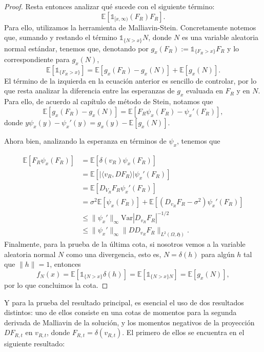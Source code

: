 \documentclass[letterpaper,twoside]{book}
\newcommand{\E}{\mathbb{E}}
\newcommand{\1}{\mathds{1}}
\newcommand{\abs}[1]{\left\lvert #1 \right\rvert}
\theoremstyle{definition}
\theoremstyle{definition}
\theoremstyle{definition}
\theoremstyle{definition}
\theoremstyle{definition}
\theoremstyle{definition}
\theoremstyle{definition}
\begin{document}
\begin{proof}
   Resta entonces analizar qué sucede con el siguiente término:
   \[
    \E\left[\1_{[x,\infty)}(F_R)F_R\right].
   \]
   Para ello, utilizamos la herramienta de Malliavin-Stein. Concretamente notemos que, sumando y restando el término $\1_{\{N>x\}}N$, donde $N$ es una variable aleatoria normal estándar, tenemos que, denotando por $g_x(F_R):=\1_{\{F_R>x\}}F_R$ y lo correspondiente para $g_x(N)$, 
   \[
    \E\left[\1_{\{F_R>x\}}\right]=\E\left[g_x(F_R)-g_x(N)\right]+\E\left[g_x(N)\right].
   \]
   El término de la izquierda en la ecuación anterior es sencillo de controlar, por lo que resta analizar la diferencia entre las esperanzas de $g_x$ evaluada en $F_R$ y en $N$. Para ello, de acuerdo al capítulo de método de Stein, notamos que 
   \[
   \E\left[g_x(F_R)-g_x(N)\right]=\E\left[F_R\psi_x(F_R)-\psi_x'(F_R)\right], 
   \]
   donde $y\psi_x(y)-\psi_x'(y)=g_x(y)-\E\left[g_x(N)\right]$.

   Ahora bien, analizando la esperanza en términos de $\psi_x$, tenemos que 
   
   \begin{align*}
    \E\left[F_R\psi_x(F_R)\right]&=\E\left[\delta(v_R)\psi_x(F_R)\right]\\
    &=\E\left[\abs{\langle v_R,DF_R\rangle}\psi_x'(F_R)\right]\\
    &=\E\left[D_{V_R}F_R\psi_x'(F_R)\right]\\
    &=\sigma^2 \E\left[\psi_x(F_R)\right]+\E\left[\left(D_{v_R}F_R-\sigma^2\right)\psi_x'(F_R)\right]\\
    &\le \|\psi_x'\|_\infty \text{Var}\abs{D_{v_R}F_R}^{-1/2}\\
    &\leq \|\psi_x'\|_\infty \|DD_{v_R}F_R\|_{L^2(\Omega,\mathfrak{H})}.
   \end{align*}
   Finalmente, para la prueba de la última cota, si nosotros vemos a la variable aleatoria normal $N$ como una divergencia, esto es, $N=\delta(h)$ para algún $h$ tal que $\|h\|=1$, entonces 
   \[
    f_N(x)=\E\left[\1_{\{N>x\}}\delta(h)\right]=\E\left[\1_{\{N>x\}N}\right]=\E\left[g_x(N)\right],
   \]
   por lo que concluimos la cota.
 \end{proof}

Y para la prueba del resultado principal, es esencial el uso de dos resultados distintos: uno de ellos consiste en una cotas de momentos para la segunda derivada de Malliavin de la solución, y los momentos negativos de la proyección $DF_{R,t}$ en $v_{R,t}$, donde $F_{R,t}=\delta(v_{R,t})$. El primero de ellos se encuentra en el siguiente resultado:
\end{document}
